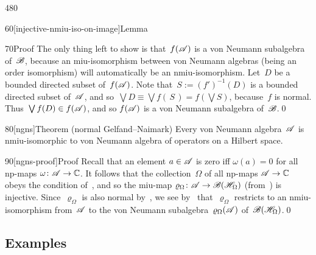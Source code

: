\begin{parsec}{480}
\begin{point}{60}[injective-nmiu-iso-on-image]{Lemma}
\begin{point}{70}{Proof}
The only thing left to show is that~$f(\mathscr{A})$
is a von Neumann subalgebra of~$\mathscr{B}$,
because an miu-isomorphism between von Neumann algebras
(being an order isomorphism)
will automatically be an nmiu-isomorphism.
Let~$D$ be a bounded directed subset of~$f(\mathscr{A})$.
Note that~$S:=(f')^{-1}(D)$ is a bounded
directed subset of~$\mathscr{A}$,
and so~$\bigvee D\equiv  \bigvee f(\,S\,)
= f(\bigvee S)$, because~$f$ is normal.
Thus~$\bigvee f(D)\in f(\mathscr{A})$,
and so $f(\mathscr{A})$ is a von Neumann subalgebra of~$\mathscr{B}$.\qed
\end{point}
\end{point}
\begin{point}{80}[ngns]{Theorem (normal Gelfand--Naimark)}%
%
Every von Neumann algebra~$\mathscr{A}$ is nmiu-isomorphic
to von Neumann algebra of operators on a Hilbert space.
\begin{point}{90}[ngns-proof]{Proof}%
Recall that an element $a\in \mathscr{A}$ is zero iff $\omega(a)=0$
for all np-maps $\omega\colon \mathscr{A}\to\mathbb{C}$.
It follows that the collection~$\Omega$
of all np-maps $\mathscr{A}\to\mathbb{C}$
obeys the condition of~,
and so the miu-map $\varrho_\Omega\colon \mathscr{A}\to\mathscr{B}(\mathscr{H}_\Omega)$
(from~)
is injective.
Since~$\varrho_\Omega$
is also normal by~,
we see by~ that~$\varrho_\Omega$
restricts to an nmiu-isomorphism
from~$\mathscr{A}$ to the von Neumann subalgebra~$\varrho_\Omega(\mathscr{A})$
of~$\mathscr{B}(\mathscr{H}_\Omega)$.\qed
\end{point}
\end{point}
\end{parsec}
\subsection{Examples}

